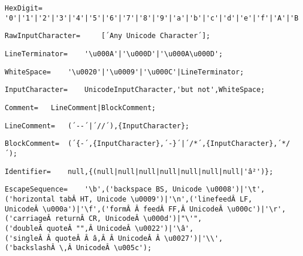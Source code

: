 \documentclass{article}
\begin{document}
    \begin{lstlisting}[mathescape=true]
     HexDigit= 	'0'|'1'|'2'|'3'|'4'|'5'|'6'|'7'|'8'|'9'|'a'|'b'|'c'|'d'|'e'|'f'|'A'|'B'|'C'|'D'|'E'|'F';
    \end{lstlisting}
    
    \begin{lstlisting}[mathescape=true]
     RawInputCharacter= 	[´Any Unicode Character´];
    \end{lstlisting}
    
    \begin{lstlisting}[mathescape=true]
     LineTerminator= 	'\u000A'|'\u000D'|'\u000A\u000D';
    \end{lstlisting}
    
    \begin{lstlisting}[mathescape=true]
     WhiteSpace= 	'\u0020'|'\u0009'|'\u000C'|LineTerminator;
    \end{lstlisting}
    
    \begin{lstlisting}[mathescape=true]
     InputCharacter= 	UnicodeInputCharacter,'but not',WhiteSpace;
    \end{lstlisting}
    
    \begin{lstlisting}[mathescape=true]
     Comment= 	LineComment|BlockComment;
    \end{lstlisting}
    
    \begin{lstlisting}[mathescape=true]
     LineComment= 	(´--´|´//´),{InputCharacter};
    \end{lstlisting}
    
    \begin{lstlisting}[mathescape=true]
     BlockComment= 	(´{-´,{InputCharacter},´-}´|´/*´,{InputCharacter},´*/´);
    \end{lstlisting}
    
    \begin{lstlisting}[mathescape=true]
     Identifier= 	null,{(null|null|null|null|null|null|null|'â²')};
    \end{lstlisting}
    
    \begin{lstlisting}[mathescape=true]
     EscapeSequence= 	'\b',('backspace BS, Unicode \u0008')|'\t',('horizontal tabÂ HT, Unicode \u0009')|'\n',('linefeedÂ LF, UnicodeÂ \u000a')|'\f',('formÂ Â feedÂ FF,Â UnicodeÂ \u000c')|'\r',('carriageÂ returnÂ CR, UnicodeÂ \u000d')|"\'",('doubleÂ quoteÂ "",Â UnicodeÂ \u0022')|'\â',('singleÂ Â quoteÂ Â â,Â Â UnicodeÂ Â \u0027')|'\\',('backslashÂ \,Â UnicodeÂ \u005c');
    \end{lstlisting}
    
\end{document}
